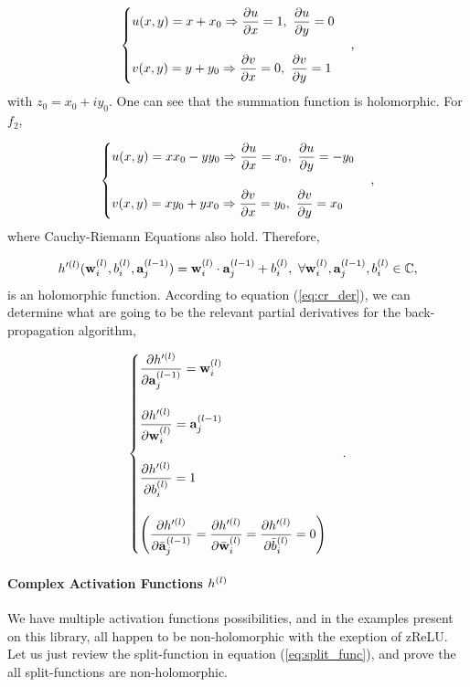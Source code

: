 \begin{equation}
	\begin{cases}
		u(x,y) = x + x_0 \Rightarrow \dfrac{\partial u}{\partial x} = 1, \ \dfrac{\partial u}{\partial y} = 0 \\
		\\
		v(x,y) = y + y_0 \Rightarrow \dfrac{\partial v}{\partial x} = 0, \ \dfrac{\partial v}{\partial y} = 1
	\end{cases},
\end{equation}
with $ z_0 = x_0 + iy_0 $. One can see that the summation function is holomorphic. For $ f_2 $,

\begin{equation}
	\begin{cases}
		u(x,y) = x  x_0 - y y_0 \Rightarrow \der{u}{x} = x_0, \ \der{u}{y} = -y_0 \\
		\\
		v(x,y) = x y_0 + y x_0 \Rightarrow \der{v}{x} = y_0, \ \der{v}{y} = x_0
	\end{cases},
\end{equation}
where Cauchy-Riemann Equations also hold. Therefore,

\begin{equation}
	h'^{(l)}(\mathbf{w}^{(l)}_{i}, b^{(l)}_{i}, \mathbf{a}^{(l-1)}_{j}) = \mathbf{w}^{(l)}_{i} \cdot \mathbf{a}^{(l-1)}_{j} + b^{(l)}_{i}, \  \forall\mathbf{w}^{(l)}_{i}, \mathbf{a}^{(l-1)}_{j}, b^{(l)}_{i} \in \mathbb{C},
\end{equation}
is an holomorphic function. According to equation (\ref{eq:cr_der}), we can determine what are going to be the relevant partial derivatives for the back-propagation algorithm,

\begin{equation}
	\begin{cases}
		\dfrac{\partial h'^{(l)}}{\partial \mathbf{a}^{(l-1)}_{j}} = \mathbf{w}^{(l)}_{i} \\
		\\
		\dfrac{\partial h'^{(l)}}{\partial \mathbf{w}^{(l)}_{i}} = \mathbf{a}^{(l-1)}_{j} \\
		\\
		\dfrac{\partial h'^{(l)}}{\partial b^{(l)}_{i}} = 1 \\
		\\
		\left( \dfrac{\partial h'^{(l)}}{\partial \bar{\mathbf{a}}^{(l-1)}_{j}} = \dfrac{\partial h'^{(l)}}{\partial \bar{\mathbf{w}}^{(l)}_{i}} = \dfrac{\partial h'^{(l)}}{\partial \bar{b}^{(l)}_{i}} = 0 \right)
	\end{cases}.
\end{equation}

\paragraph{Complex Activation Functions $ h^{(l)} $}
We have multiple activation functions possibilities, and in the examples present on this library, all happen to be non-holomorphic with the exeption of zReLU. Let us just review the split-function in equation (\ref{eq:split_func}), and prove the all split-functions are non-holomorphic.

